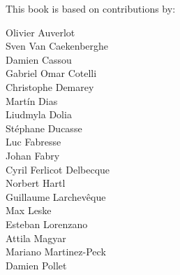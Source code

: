 \documentclass[11pt,english,oneside]{../support/latex/sbabook/sbabook}
\begin{document}
\clearpage
\small\color{white}

This book is based on contributions by:
\begin{multicols}{3}
Olivier Auverlot\\
Sven Van Caekenberghe\\
Damien Cassou\\
Gabriel Omar Cotelli\\
Christophe Demarey\\
Martín Dias\\
Liudmyla Dolia\\
Stéphane Ducasse\\
Luc Fabresse\\
Johan Fabry\\
Cyril Ferlicot Delbecque\\
Norbert Hartl\\
Guillaume Larchevêque\\
Max Leske\\
Esteban Lorenzano\\
Attila Magyar\\
Mariano Martinez-Peck\\
Damien Pollet\\
\end{multicols}
\end{document}
